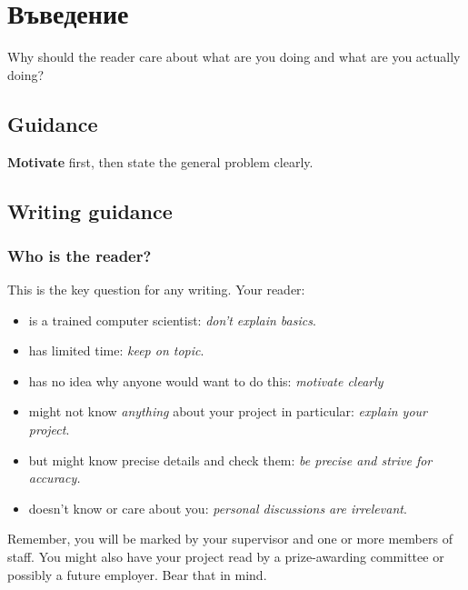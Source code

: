 \chapter{Въведение}



Why should the reader care about what are you doing and what are you actually doing?

\section{Guidance}

\textbf{Motivate} first, then state the general problem clearly. 

\section{Writing guidance}
\subsection{Who is the reader?}

This is the key question for any writing. Your reader:

\begin{itemize}
    \item
    is a trained computer scientist: \emph{don't explain basics}.
    \item
    has limited time: \emph{keep on topic}.
    \item
    has no idea why anyone would want to do this: \emph{motivate clearly}
    \item
    might not know \emph{anything} about your project in particular:
    \emph{explain your project}.
    \item
    but might know precise details and check them: \emph{be precise and
    strive for accuracy.}
    \item
    doesn't know or care about you: \emph{personal discussions are
    irrelevant}.
\end{itemize}

Remember, you will be marked by your supervisor and one or more members
of staff. You might also have your project read by a prize-awarding
committee or possibly a future employer. Bear that in mind.

